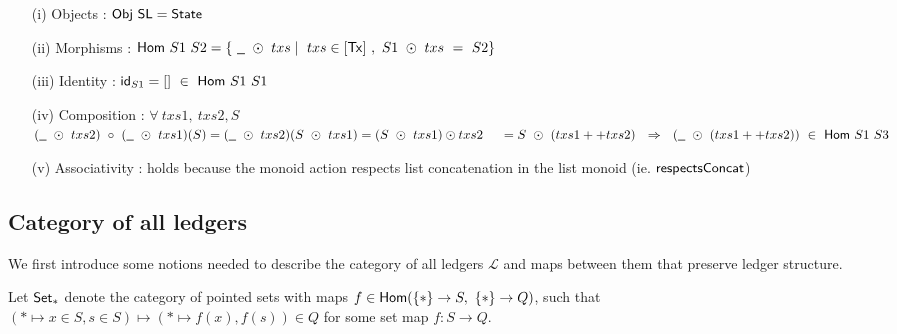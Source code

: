 \begin{itemize}
  \item[(i)] Objects : $\mathsf{Obj}~\mathsf{SL} = \mathsf{State}$ \newline

  \item[(ii)] Morphisms : $\fun{Hom}~S1~S2 = \{ ~\wcard~\odot~txs \mid ~txs \in [\Tx]~,~S1~ \odot~txs~=~S2 \}$ \newline

  \item[(iii)] Identity : $\mathsf{id}_{S1} = [] ~\in~\mathsf{Hom}~S1~S1 $ \newline

  \item[(iv)] Composition : $\forall~txs1,~txs2, S$ \\
  $(\wcard~\odot~txs2) ~\circ~(\wcard~\odot~txs1) (S) = (\wcard~\odot~txs2) (S~\odot~txs1) = (S~\odot~txs1) \odot txs2  \\
  ~~~~ =  S~\odot~(txs1 ++ txs2)~~\Rightarrow ~~(\wcard~\odot~(txs1 ++ txs2))~\in ~\fun{Hom}~S1~S3$

  \item[(v)] Associativity : holds because the monoid action respects list concatenation
  in the list monoid (ie. $\mathsf{respectsConcat}$)\\

\end{itemize}


\subsection{Category of all ledgers}
\label{sec:all-ledgers}

We first introduce some notions needed to describe the category of all ledgers $\mathcal{L}$
and maps between them that preserve ledger structure.

Let $\mathsf{Set}_{*}$ denote the category of pointed sets with maps $f \in \mathsf{Hom} (\{*\} \to S,~\{*\} \to Q)$,
such that $({*} \mapsto x \in S, s \in S) \mapsto (* \mapsto f(x), f(s)) \in Q$ for some
set map $f : S \to Q$.

